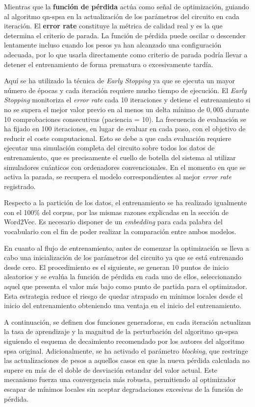 Mientras que la \textbf{función de pérdida} actúa como señal de optimización, guiando al algoritmo \gls{qn-spsa} en la actualización de los parámetros del circuito en cada iteración. El \textbf{error rate} constituye la métrica de calidad real y es la que determina el criterio de parada. La función de pérdida puede oscilar o descender lentamente incluso cuando los pesos ya han alcanzado una configuración adecuada, por lo que usarla directamente como criterio de parada podría llevar a detener el entrenamiento de forma prematura o excesivamente tardía.

Aquí se ha utilizado la técnica de \textit{Early Stopping} ya que se ejecuta un mayor número de épocas y cada iteración requiere mucho tiempo de ejecución. El \textit{Early Stopping} monitoriza el \textit{error rate} cada 10 iteraciones y detiene el entrenamiento si no se supera el mejor valor previo en al menos un delta mínimo de $0{,}005$ durante 10 comprobaciones consecutivas (paciencia = 10). La frecuencia de evaluación se ha fijado en 100 iteraciones, en lugar de evaluar en cada paso, con el objetivo de reducir el coste computacional. Esto se debe a que cada evaluación requiere ejecutar una simulación completa del circuito sobre todos los datos de entrenamiento, que es precisamente el cuello de botella del sistema al utilizar simuladores cuánticos con ordenadores convencionales. En el momento en que se activa la parada, se recupera el modelo correspondientes al mejor \textit{error rate} registrado.

Respecto a la partición de los datos, el entrenamiento se ha realizado igualmente con el 100\% del corpus, por las mismas razones explicadas en la sección de Word2Vec. Es necesario disponer de un \textit{embedding} para cada palabra del vocabulario con el fin de poder realizar la comparación entre ambos modelos.

En cuanto al flujo de entrenamiento, antes de comenzar la optimización se lleva a cabo una inicialización de los parámetros del circuito ya que se está entrenando desde cero. El procedimiento es el siguiente, se generan 10 puntos de inicio aleatorios y se evalúa la función de pérdida en cada uno de ellos, seleccionando aquel que presenta el valor más bajo como punto de partida para el optimizador. Esta estrategia reduce el riesgo de quedar atrapado en mínimos locales desde el inicio del entrenamiento obteniendo una ventaja en el inicio del entrenamiento.

A continuación, se definen dos funciones generadoras, en cada iteración actualizan la tasa de aprendizaje y la magnitud de la perturbación del algoritmo \gls{qn-spsa} siguiendo el esquema de decaimiento recomendado por los autores del algoritmo \gls{spsa} original. Adicionalmente, se ha activado el parámetro \textit{blocking}, que restringe las actualizaciones de pesos a aquellos casos en que la nueva pérdida calculada no supere en más de el doble de desviación estandar del valor actual. Este mecanismo fuerza una convergencia más robusta, permitiendo al optimizador escapar de mínimos locales sin aceptar degradaciones excesivas de la función de pérdida.

